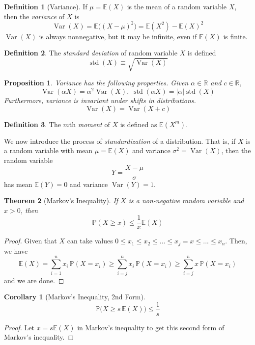 \documentclass{article}
\DeclareMathOperator{\std}{std}
\DeclareMathOperator{\Var}{Var}
\newtheorem{theorem}{Theorem}[section]
\newtheorem{proposition}[theorem]{Proposition}
\newtheorem{corollary}{Corollary}[theorem]
\theoremstyle{remark}
\theoremstyle{definition}
\newtheorem{definition}{Definition}[section]
\begin{document}
\begin{definition}[Variance]
If $\mu = \mathbb{E}(X)$ is the mean of a random variable $X$, then the \textit{variance} of $X$ is 
\[\Var(X) = \mathbb{E} \big( (X - \mu)^2 \big) = \mathbb{E}(X^2) - \mathbb{E}(X)^2\]
$\Var(X)$ is always nonnegative, but it may be infinite, even if $\mathbb{E}(X)$ is finite. 
\end{definition}

\begin{definition}
The \textit{standard deviation} of random variable $X$ is defined 
\[\std(X)\equiv \sqrt{\Var(X)}\]
\end{definition}

\begin{proposition}
Variance has the following properties. Given $\alpha \in \mathbb{R}$ and $c \in \mathbb{R}$,
\[\Var(\alpha X) = \alpha^2 \Var(X), \; \std(\alpha X) = |\alpha| \std(X)\]
Furthermore, variance is invariant under shifts in distributions. 
\[\Var(X) = \Var(X + c)\]
\end{proposition}

\begin{definition}
The $m$th \textit{moment} of $X$ is defined as $\mathbb{E}(X^m)$. 
\end{definition}

We now introduce the process of \textit{standardization} of a distribution. That is, if $X$ is a random variable with mean $\mu = \mathbb{E}(X)$ and variance $\sigma^2 = \Var(X)$, then the random variable 
\[Y = \frac{X - \mu}{\sigma}\]
has mean $\mathbb{E}(Y) = 0$ and variance $\Var(Y) = 1$. 

\begin{theorem}[Markov's Inequality]
If $X$ is a non-negative random variable and $x >0$, then 
\[\mathbb{P}(X \geq x) \leq \frac{1}{x} \mathbb{E}(X)\]
\end{theorem}
\begin{proof}
Given that $X$ can take values $0 \leq x_1 \leq x_2 \leq ... \leq x_j = x \leq ... \leq x_n$. Then, we have
\[\mathbb{E}(X) = \sum_{i=1}^n x_i \, \mathbb{P}(X=x_i) \geq \sum_{i=j}^n x_i \, \mathbb{P}(X=x_i) \geq \sum_{i=j}^n x \, \mathbb{P}(X=x_i)\]
and we are done. 
\end{proof}

\begin{corollary}[Markov's Inequality, 2nd Form]
\[\mathbb{P}\big( X \geq s \, \mathbb{E}(X) \big) \leq \frac{1}{s} \]
\end{corollary}
\begin{proof}
Let $x = s \mathbb{E}(X)$ in Markov's inequality to get this second form of Markov's inequality. 
\end{proof}
\end{document}
